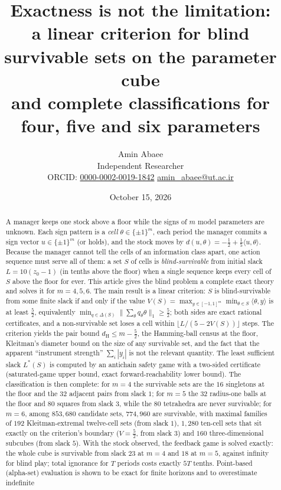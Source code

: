 \documentclass[11pt,a4paper]{article}
\theoremstyle{plain}
\theoremstyle{definition}
\theoremstyle{remark}
\newcommand{\dH}{d_{\mathrm{H}}}
\newcommand{\tfr}[2]{\tfrac{#1}{#2}}
\newcommand{\Lstar}{L^{\ast}}
\begin{document}
\title{\textbf{Exactness is not the limitation:\\ a linear criterion for blind survivable sets on the parameter cube\\ and complete classifications for four, five and six parameters}}
\author{Amin Abaee\\[0.3em]
{\small Independent Researcher}\\[0.2em]
{\small ORCID: \href{https://orcid.org/0000-0002-0019-1842}{0000-0002-0019-1842}\quad
\href{mailto:amin_abaee@ut.ac.ir}{amin\_abaee@ut.ac.ir}}}
\date{October 15, 2026}
\maketitle

\begin{abstract}
\noindent
A manager keeps one stock above a floor while the signs of $m$ model parameters are unknown. Each sign pattern is a \emph{cell} $\theta\in\{\pm1\}^m$, each period the manager commits a sign vector $u\in\{\pm1\}^m$ (or holds), and the stock moves by $d(u,\theta)=-\tfr12+\tfr15\langle u,\theta\rangle$. Because the manager cannot tell the cells of an information class apart, one action sequence must serve all of them: a set $S$ of cells is \emph{blind-survivable} from initial slack $L=10(z_0-1)$ (in tenths above the floor) when a single sequence keeps every cell of $S$ above the floor for ever. This article gives the blind problem a complete exact theory and solves it for $m=4,5,6$. The main result is a linear criterion: $S$ is blind-survivable from some finite slack if and only if the value $V(S)=\max_{y\in[-1,1]^m}\min_{\theta\in S}\langle\theta,y\rangle$ is at least $\tfr52$, equivalently $\min_{q\in\Delta(S)}\|\sum_\theta q_\theta\theta\|_1\ge\tfr52$; both sides are exact rational certificates, and a non-survivable set loses a cell within $\lfloor L/(5-2V(S))\rfloor$ steps. The criterion yields the pair bound $\dH\le m-\tfr52$, the Hamming-ball census at the floor, Kleitman's diameter bound on the size of any survivable set, and the fact that the apparent ``instrument strength'' $\sum_i|y_i|$ is not the relevant quantity. The least sufficient slack $\Lstar(S)$ is computed by an antichain safety game with a two-sided certificate (saturated-game upper bound, exact forward-reachability lower bound). The classification is then complete: for $m=4$ the survivable sets are the $16$ singletons at the floor and the $32$ adjacent pairs from slack $1$; for $m=5$ the $32$ radius-one balls at the floor and $80$ squares from slack $3$, while the $80$ tetrahedra are never survivable; for $m=6$, among $853{,}680$ candidate sets, $774{,}960$ are survivable, with maximal families of $192$ Kleitman-extremal twelve-cell sets (from slack $1$), $1{,}280$ ten-cell sets that sit exactly on the criterion's boundary ($V=\tfr52$, from slack $3$) and $160$ three-dimensional subcubes (from slack $5$). With the stock observed, the feedback game is solved exactly: the whole cube is survivable from slack $23$ at $m=4$ and $18$ at $m=5$, against infinity for blind play; total ignorance for $T$ periods costs exactly $5T$ tenths. Point-based (alpha-set) evaluation is shown to be exact for finite horizons and to overestimate indefinite 
\end{abstract}
\end{document}
